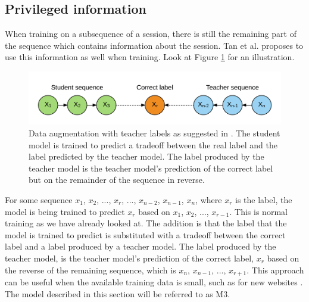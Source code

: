\subsection{Privileged information}
When training on a subsequence of a session, there is still the remaining part of the sequence which contains information about the session. Tan et al. proposes to use this information as well when training. Look at Figure \ref{fig:rnn-teacher-student} for an illustration.

\begin{figure}[htp]
	\centering
	\includegraphics[width=1.0\textwidth]{fig/rnn-teacher-student.png}
	\caption{Data augmentation with teacher labels as suggested in \cite{DBLP:journals/corr/TanXL16}. The student model is trained to predict a tradeoff between the real label and the label predicted by the teacher model. The label produced by the teacher model is the teacher model's prediction of the correct label but on the remainder of the sequence in reverse.}
	\label{fig:rnn-teacher-student}
\end{figure}

For some sequence \lbrack $x_1$, $x_2$, ..., $x_r$, ..., $x_{n-2}$, $x_{n-1}$, $x_n$\rbrack, where $x_r$ is the label, the model is being trained to predict $x_r$ based on \lbrack $x_1$, $x_2$, ..., $x_{r-1}$\rbrack. This is normal training as we have already looked at. The addition is that the label that the model is trained to predict is substituted with a tradeoff between the correct label and a label produced by a teacher model. The label produced by the teacher model, is the teacher model's prediction of the correct label, $x_r$ based on the reverse of the remaining sequence, which is \lbrack $x_n$, $x_{n-1}$, ..., $x_{r+1}$\rbrack. This approach can be useful when the available training data is small, such as for new websites \cite{DBLP:journals/corr/TanXL16}. The model described in this section will be referred to as M3.

